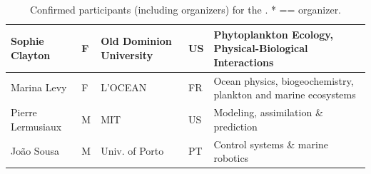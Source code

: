 \begin{table}[H]
{\begin{tabular}{|p{3.5cm}|p{0.7cm}|p{4.0cm}|p{0.5cm}|p{6.0cm}|}
  \hline
  Sophie Clayton           & F   & Old Dominion University              & US       & Phytoplankton Ecology, Physical-Biological Interactions\\
  \hline
  Marina Levy              & F   & L'OCEAN                              & FR       & Ocean physics, biogeochemistry, plankton and marine ecosystems\\
  \hline
  Pierre Lermusiaux        & M   & MIT & US       &Modeling, assimilation \& prediction\\
  \hline
  Jo\~ao Sousa               & M   & Univ. of Porto & PT       &
                                                                 Control systems \& marine robotics                      \\
  \hline
\end{tabular}
}
\caption{Confirmed participants (including organizers) for the
  \sympe. * == organizer.}
\label{tab:part}
\end{table}

